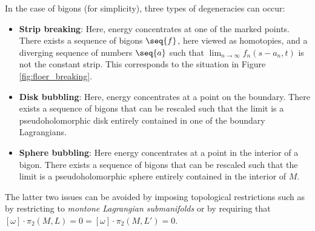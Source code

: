 \begin{property}
        In the case of bigons (for simplicity), three types of degeneracies can occur:
        \begin{itemize}
            \item\textbf{Strip breaking}: Here, energy concentrates at one of the marked points. There exists a sequence of bigons $\seq{f}$, here viewed as homotopies, and a diverging sequence of numbers $\seq{a}$ such that
            $\lim_{n\rightarrow\infty}f_n(s-a_n,t)$ is not the constant strip. This corresponds to the situation in Figure \ref{fig:floer_breaking}.
            \item\textbf{Disk bubbling}: Here, energy concentrates at a point on the boundary. There exists a sequence of bigons that can be rescaled such that the limit is a pseudoholomorphic disk entirely contained in one of the boundary Lagrangians.
            \item\textbf{Sphere bubbling}: Here energy concentrates at a point in the interior of a bigon. There exists a sequence of bigons that can be rescaled such that the limit is a pseudoholomorphic sphere entirely contained in the interior of $M$.
        \end{itemize}
        The latter two issues can be avoided by imposing topological restrictions such as by restricting to \textit{montone Lagrangian submanifolds} or by requiring that $[\omega]\cdot\pi_2(M,L)=0=[\omega]\cdot\pi_2(M,L')=0$.
    \end{property}


